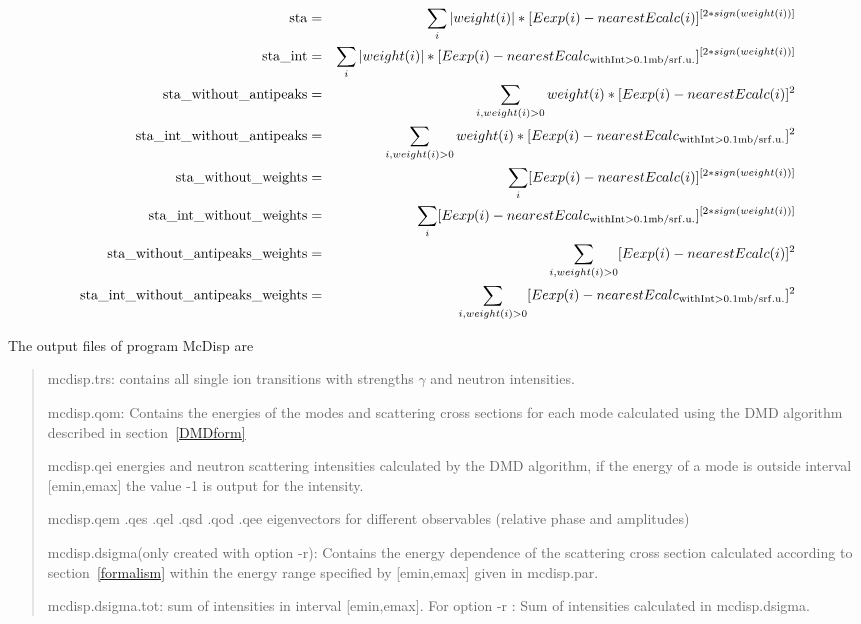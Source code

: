 \begin{eqnarray}
{\rm sta}                              & =& \sum_i |weight(i)|*[Eexp(i) - nearestEcalc(i)]^{[2*sign(weight(i))]}\\
{\rm sta\_int   }                       & = &\sum_i |weight(i)|*[Eexp(i) - nearestEcalc_{\rm with %
Int>0.1mb/srf.u.}]^{[2*sign(weight(i))]}\\
{\rm sta\_without\_antipeaks }           & =& \sum_{i, weight(i)>0}  weight(i)*[Eexp(i) - nearestEcalc(i)]^2\\
{\rm sta\_int\_without\_antipeaks }       & =&\sum_{i,weight(i)>0}  weight(i)*[Eexp(i) - nearestEcalc_{\rm with %
Int>0.1mb/srf.u.}]^2\\
{\rm sta\_without\_weights }              &=& \sum_i [Eexp(i) - nearestEcalc(i)]^{[2*sign(weight(i))]}\\
{\rm sta\_int\_without\_weights}          & =&\sum_i [Eexp(i) - nearestEcalc_{\rm with %
Int>0.1mb/srf.u.}]^{[2*sign(weight(i))]}\\
{\rm sta\_without\_antipeaks\_weights}    & = &\sum_{i, weight(i)>0}[Eexp(i) - nearestEcalc(i)]^2\\
{\rm sta\_int\_without\_antipeaks\_weights}& =& \sum_{i, weight(i)>0} [Eexp(i) - nearestEcalc_{\rm with %
Int>0.1mb/srf.u.}]^2\\
\end{eqnarray}




The output files of program {\prg McDisp} are 

\begin{quote}
\item[{\prg mcdisp.trs}:] contains all single ion transitions with strengths $\gamma$ 
and neutron intensities.
\item [{\prg mcdisp.qom}:] Contains the energies of the modes and scattering cross sections  for each mode 
calculated using the DMD algorithm described in section~\ref{DMDform}
\item[{\prg mcdisp.qei}] energies and neutron scattering intensities calculated by the DMD algorithm, if 
        the energy of a mode is outside interval  [emin,emax] the value -1 is output for the intensity.
\item[{\prg mcdisp.qem .qes .qel .qsd .qod .qee}] eigenvectors for different observables (relative phase and amplitudes)
\item [{\prg mcdisp.dsigma}(only created with option {\prg -r}):] Contains the energy dependence of the scattering cross %
section
calculated according to section~\ref{formalism} within the energy range specified by [emin,emax] given in {\prg %
mcdisp.par}. 
\item [{\prg mcdisp.dsigma.tot}:] sum of intensities in interval  [emin,emax].  For option {\prg -r} : Sum of intensities calculated in {\prg %
mcdisp.dsigma}.
\end{quote}

